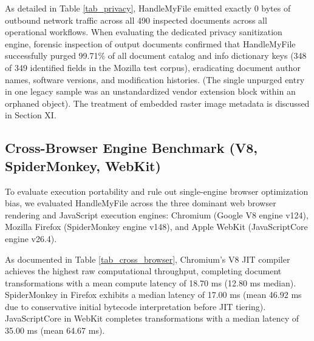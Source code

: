 \documentclass[journal]{IEEEtran}
\begin{document}
As detailed in Table \ref{tab_privacy}, HandleMyFile emitted exactly 0 bytes of outbound network traffic across all 490 inspected documents across all operational workflows. When evaluating the dedicated privacy sanitization engine, forensic inspection of output documents confirmed that HandleMyFile successfully purged 99.71\% of all document catalog and info dictionary keys (348 of 349 identified fields in the Mozilla test corpus), eradicating document author names, software versions, and modification histories. (The single unpurged entry in one legacy sample was an unstandardized vendor extension block within an orphaned object). The treatment of embedded raster image metadata is discussed in Section XI.

\subsection{Cross-Browser Engine Benchmark (V8, SpiderMonkey, WebKit)}
To evaluate execution portability and rule out single-engine browser optimization bias, we evaluated HandleMyFile across the three dominant web browser rendering and JavaScript execution engines: Chromium (Google V8 engine v124), Mozilla Firefox (SpiderMonkey engine v148), and Apple WebKit (JavaScriptCore engine v26.4). 

\begin{table}[!t]
\centering
\caption{Cross-Browser Engine Performance and Zero-Egress Invariance}
\label{tab_cross_browser}
\end{table}

As documented in Table \ref{tab_cross_browser}, Chromium's V8 JIT compiler achieves the highest raw computational throughput, completing document transformations with a mean compute latency of 18.70 ms (12.80 ms median). SpiderMonkey in Firefox exhibits a median latency of 17.00 ms (mean 46.92 ms due to conservative initial bytecode interpretation before JIT tiering). JavaScriptCore in WebKit completes transformations with a median latency of 35.00 ms (mean 64.67 ms). 
\end{document}
